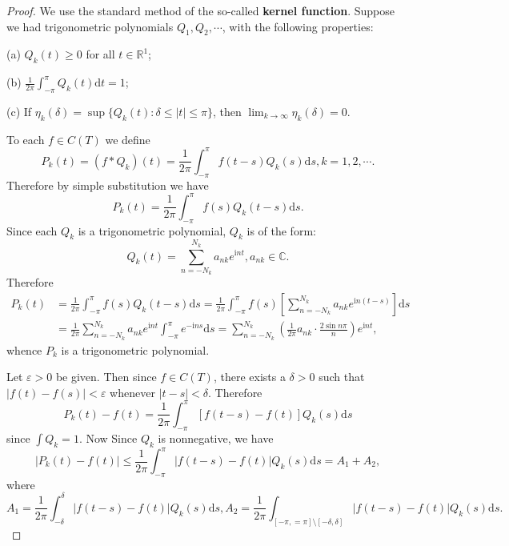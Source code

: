 \begin{proof}
We use the standard method of the so-called \textbf{kernel function}. Suppose we had trigonometric polynomials $Q_1,Q_2,\cdots$, with the following properties:\par
(a) $Q_k(t)\ge 0$ for all $t\in\mathbb{R}^1$;\par
(b) $\frac{1}{2\pi}\int_{-\pi}^{\pi}Q_k(t)\mathrm{d}t=1$;\par
(c) If $\eta_k(\delta)=\sup\{Q_k(t):\delta\le|t|\le\pi\}$, then $\lim_{k\to\infty}\eta_k(\delta)=0$.\par
To each $f\in C(T)$ we define 
$$
P_k\left( t \right) =\left( f*Q_k \right) \left( t \right) =\frac{1}{2\pi}\int_{-\pi}^{\pi}{f\left( t-s \right) Q_k\left( s \right) \mathrm{d}s},k=1,2,\cdots .
$$
Therefore by simple substitution we have 
$$
P_k\left( t \right) =\frac{1}{2\pi}\int_{-\pi}^{\pi}{f\left( s \right) Q_k\left( t-s \right) \mathrm{d}s}.
$$
Since each $Q_k$ is a trigonometric polynomial, $Q_k$ is of the form: 
$$
Q_k\left( t \right) =\sum_{n=-N_k}^{N_k}{a_{nk}e^{\mathrm{i}nt}},a_{nk}\in \mathbb{C} .
$$
Therefore 
$$
\begin{aligned}
P_k\left( t \right) &=\frac{1}{2\pi}\int_{-\pi}^{\pi}{f\left( s \right) Q_k\left( t-s \right) \mathrm{d}s}=\frac{1}{2\pi}\int_{-\pi}^{\pi}{f\left( s \right) \left[ \sum_{n=-N_k}^{N_k}{a_{nk}e^{\mathrm{i}n\left( t-s \right)}} \right] \mathrm{d}s}
\\
&=\frac{1}{2\pi}\sum_{n=-N_k}^{N_k}{a_{nk}e^{\mathrm{i}nt}\int_{-\pi}^{\pi}{e^{-\mathrm{i}ns}\mathrm{d}s}}=\sum_{n=-N_k}^{N_k}{\left( \frac{1}{2\pi}a_{nk}\cdot \frac{2\sin n\pi}{n} \right) e^{\mathrm{i}nt}},
\end{aligned}
$$
whence $P_k$ is a trigonometric polynomial.\par
Let $\varepsilon>0$ be given. Then since $f\in C(T)$, there exists a $\delta>0$ such that $|f(t)-f(s)|<\varepsilon$ whenever $|t-s|<\delta$. Therefore 
$$
P_k\left( t \right) -f\left( t \right) =\frac{1}{2\pi}\int_{-\pi}^{\pi}{\left[ f\left( t-s \right) -f\left( t \right) \right] Q_k\left( s \right) \mathrm{d}s}
$$
since $\int Q_k=1$. Now Since $Q_k$ is nonnegative, we have 
$$
\left| P_k\left( t \right) -f\left( t \right) \right|\le \frac{1}{2\pi}\int_{-\pi}^{\pi}{\left| f\left( t-s \right) -f\left( t \right) \right|Q_k\left( s \right) \mathrm{d}s}=A_1+A_2,
$$
where 
$$A_1=\frac{1}{2\pi}\int_{-\delta}^{\delta}{\left| f\left( t-s \right) -f\left( t \right) \right|Q_k\left( s \right) \mathrm{d}s},A_2=\frac{1}{2\pi}\int_{\left[ -\pi ,=\pi \right] \setminus \left[ -\delta ,\delta \right]}{\left| f\left( t-s \right) -f\left( t \right) \right|Q_k\left( s \right) \mathrm{d}s}.$$

\end{proof}
